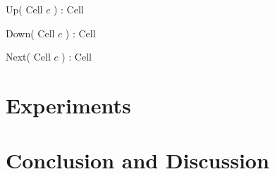 \documentclass{llncs}
\begin{document}
\begin{function}
  \caption{Up( Cell $c$ ) : Cell}
\end{function}
\begin{function}
  \caption{Down( Cell $c$ ) : Cell}
\end{function}
\begin{function}
  \caption{Next( Cell $c$ ) : Cell}
\end{function}


\section{Experiments}
\label{sec:experiments}



\section{Conclusion and Discussion}
\label{sec:discussion}





\end{document}
